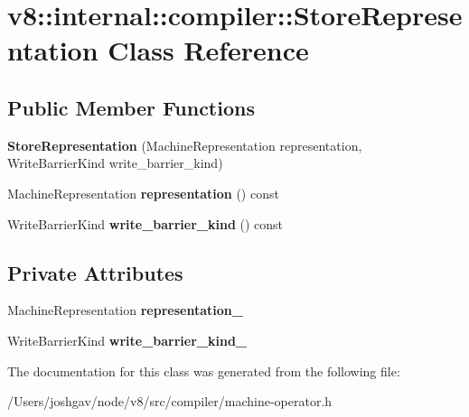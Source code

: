 \hypertarget{classv8_1_1internal_1_1compiler_1_1_store_representation}{}\section{v8\+:\+:internal\+:\+:compiler\+:\+:Store\+Representation Class Reference}
\label{classv8_1_1internal_1_1compiler_1_1_store_representation}
\subsection*{Public Member Functions}
\begin{DoxyCompactItemize}
\item 
{\bfseries Store\+Representation} (Machine\+Representation representation, Write\+Barrier\+Kind write\+\_\+barrier\+\_\+kind)\hypertarget{classv8_1_1internal_1_1compiler_1_1_store_representation_a434f7322ec291f7f4b1a8b945195a62b}{}\label{classv8_1_1internal_1_1compiler_1_1_store_representation_a434f7322ec291f7f4b1a8b945195a62b}

\item 
Machine\+Representation {\bfseries representation} () const \hypertarget{classv8_1_1internal_1_1compiler_1_1_store_representation_a4185c3d7b71a7048f43bf33a85e0b285}{}\label{classv8_1_1internal_1_1compiler_1_1_store_representation_a4185c3d7b71a7048f43bf33a85e0b285}

\item 
Write\+Barrier\+Kind {\bfseries write\+\_\+barrier\+\_\+kind} () const \hypertarget{classv8_1_1internal_1_1compiler_1_1_store_representation_acec8ece5064e60d4db619e79ea2900ae}{}\label{classv8_1_1internal_1_1compiler_1_1_store_representation_acec8ece5064e60d4db619e79ea2900ae}

\end{DoxyCompactItemize}
\subsection*{Private Attributes}
\begin{DoxyCompactItemize}
\item 
Machine\+Representation {\bfseries representation\+\_\+}\hypertarget{classv8_1_1internal_1_1compiler_1_1_store_representation_acb8a281ecad291c87181804a38508f61}{}\label{classv8_1_1internal_1_1compiler_1_1_store_representation_acb8a281ecad291c87181804a38508f61}

\item 
Write\+Barrier\+Kind {\bfseries write\+\_\+barrier\+\_\+kind\+\_\+}\hypertarget{classv8_1_1internal_1_1compiler_1_1_store_representation_a2d63f0bd2cf0ef403e3f31bbda8bc3a5}{}\label{classv8_1_1internal_1_1compiler_1_1_store_representation_a2d63f0bd2cf0ef403e3f31bbda8bc3a5}

\end{DoxyCompactItemize}


The documentation for this class was generated from the following file\+:\begin{DoxyCompactItemize}
\item 
/\+Users/joshgav/node/v8/src/compiler/machine-\/operator.\+h\end{DoxyCompactItemize}
